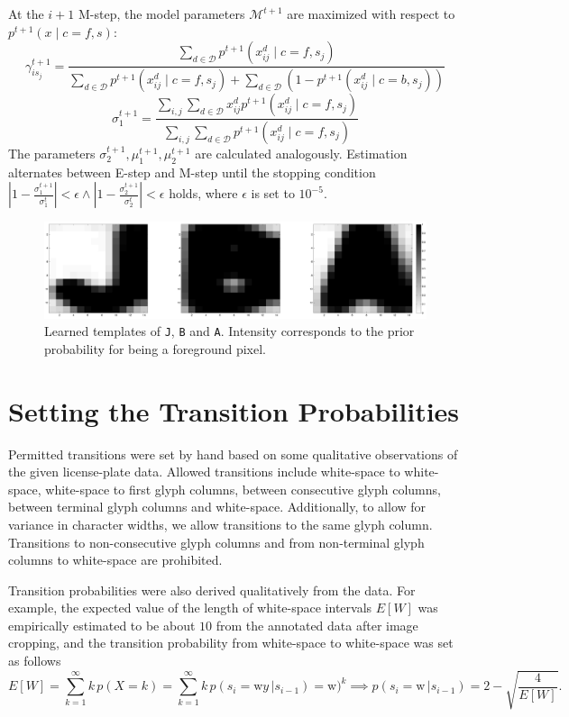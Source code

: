 \documentclass[a4paper,12pt]{article}
\newcommand{\model}{\ensuremath{\mathcal{M}}}
\begin{document}
At the $i+1$ M-step, the model parameters $\model^{t+1}$ are
maximized with respect to $p^{t+1}(x \mid c=f, s)$:
\[
  \gamma_{is_j}^{t+1} = \frac{\sum_{d \in \mathcal{D}} p^{t+1}(x^d_{ij} \mid
    c=f, s_j)}{\sum_{d \in \mathcal{D}} p^{t+1}(x^d_{ij} \mid c=f,
    s_j) + \sum_{d \in \mathcal{D}} (1-p^{t+1}(x^d_{ij} \mid c=b,
    s_j))}
\]
\[
  \sigma_1^{t+1} = \frac{\sum_{i,j} \sum_{d \in \mathcal{D}} x^d_{
      ij} p^{t+1}(x^d_{ij} \mid c=f, s_j)}{\sum_{i,j} \sum_{d \in
      \mathcal{D}} p^{t+1}(x^d_{ij} \mid c=f, s_j)}
\]
The parameters $\sigma_2^{t+1}, \mu_1^{t+1}, \mu_2^{t+1}$ are
calculated analogously. Estimation alternates between E-step and
M-step until the stopping condition
$|1-\frac{\sigma_1^{t+1}}{\sigma_1^{t}}| < \epsilon \wedge
|1-\frac{\sigma_2^{t+1}}{\sigma_2^{t}}| < \epsilon$ holds, where
$\epsilon$ is set to $10^{-5}$.

\begin{figure}[htp]
\centering
\includegraphics[width=\linewidth]{pics/jba.png}
\caption{Learned templates of \texttt{J}, \texttt{B} and
  \texttt{A}. Intensity corresponds to the prior probability for being
  a foreground pixel.}
\label{fig:templates}
\end{figure}

\section{Setting the Transition Probabilities}
Permitted transitions were set by hand based on some qualitative
observations of the given license-plate data. Allowed transitions
include white-space to white-space, white-space to first glyph
columns, between consecutive glyph columns, between terminal glyph
columns and white-space. Additionally, to allow for variance in
character widths, we allow transitions to the same glyph
column. Transitions to non-consecutive glyph columns and from
non-terminal glyph columns to white-space are prohibited.

Transition probabilities were also derived qualitatively from the
data. For example, the expected value of the length of white-space
intervals $E[W]$ was empirically estimated to be about $10$ from the
annotated data after image cropping, and the transition probability
from white-space to white-space was set as follows 
\[ 
E[W] = \sum_{k=1}^\infty k\,p(X=k) = \sum_{k=1}^\infty k
\,p(s_i=\text{w}y \,| s_{i-1})=\text{w})^k \implies p(s_i=\text{w} \,|
s_{i-1}) = 2-\sqrt{\frac{4}{E[W]}}.
\]
\end{document}
